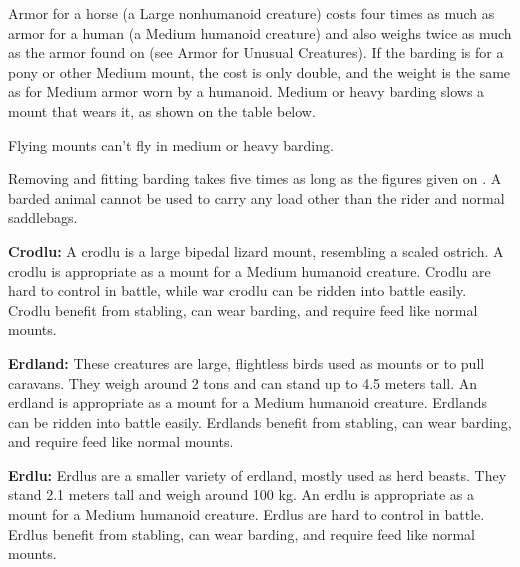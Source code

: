 Armor for a horse (a Large nonhumanoid creature) costs four times as much as armor for a human (a Medium humanoid creature) and also weighs twice as much as the armor found on  (see Armor for Unusual Creatures). If the barding is for a pony or other Medium mount, the cost is only double, and the weight is the same as for Medium armor worn by a humanoid. Medium or heavy barding slows a mount that wears it, as shown on the table below.

Flying mounts can't fly in medium or heavy barding.

Removing and fitting barding takes five times as long as the figures given on . A barded animal cannot be used to carry any load other than the rider and normal saddlebags.


\textbf{Crodlu:} A crodlu is a large bipedal lizard mount, resembling a scaled ostrich. A crodlu is appropriate as a mount for a Medium humanoid creature. Crodlu are hard to control in battle, while war crodlu can be ridden into battle easily. Crodlu benefit from stabling, can wear barding, and require feed like normal mounts.

\textbf{Erdland:} These creatures are large, flightless birds used as mounts or to pull caravans. They weigh around 2 tons and can stand up to 4.5 meters tall. An erdland is appropriate as a mount for a Medium humanoid creature. Erdlands can be ridden into battle easily. Erdlands benefit from stabling, can wear barding, and require feed like normal mounts.

\textbf{Erdlu:} Erdlus are a smaller variety of erdland, mostly used as herd beasts. They stand 2.1 meters tall and weigh around 100 kg. An erdlu is appropriate as a mount for a Medium humanoid creature. Erdlus are hard to control in battle. Erdlus benefit from stabling, can wear barding, and require feed like normal mounts.

